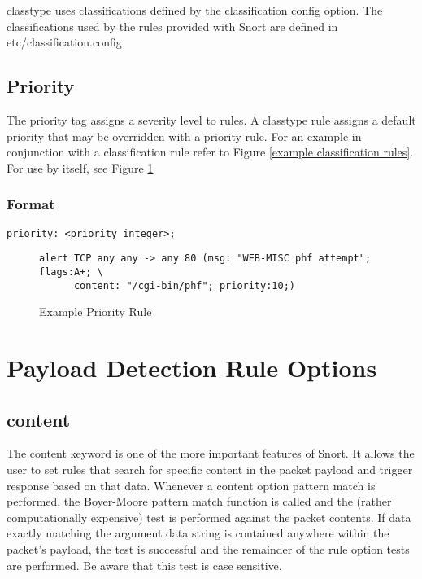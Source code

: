 \documentclass[english]{report}
\begin{document}
classtype uses classifications defined by the classification config option.  The classifications used by the rules provided with Snort are defined in etc/classification.config

\subsection{Priority}

The priority tag assigns a severity level to rules. A classtype rule
assigns a default priority that may be overridden with a priority
rule. For an example in conjunction with a classification rule refer
to Figure \ref{example classification rules}. For use by itself,
see Figure \ref{example priority rule}


\subsubsection{Format}

\begin{verbatim}
priority: <priority integer>;
\end{verbatim}

\begin{figure}[!hbpt]
\begin{verbatim}
alert TCP any any -> any 80 (msg: "WEB-MISC phf attempt"; flags:A+; \
      content: "/cgi-bin/phf"; priority:10;)
\end{verbatim}

\caption{Example Priority Rule\label{example priority rule}}
\end{figure}



\section{Payload Detection Rule Options}
\subsection{content\label{sub:content}}

The content keyword is one of the more important features of Snort.
It allows the user to set rules that search for specific content in
the packet payload and trigger response based on that data. Whenever
a content option pattern match is performed, the Boyer-Moore pattern
match function is called and the (rather computationally expensive)
test is performed against the packet contents. If data exactly matching
the argument data string is contained anywhere within the packet's
payload, the test is successful and the remainder of the rule option
tests are performed. Be aware that this test is case sensitive.
\end{document}
